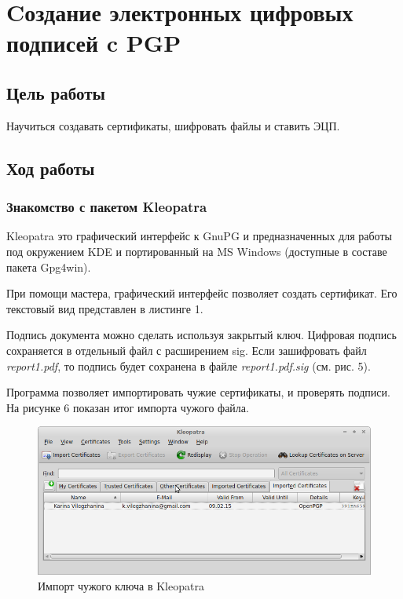 \documentclass[12pt,a4paper]{article}
\begin{document}
\section{Cоздание электронных цифровых подписей c PGP}

\subsection{Цель работы}
Научиться создавать сертификаты, шифровать файлы и ставить ЭЦП.
\subsection{Ход работы}

\subsubsection{Знакомство с пакетом Kleopatra}
Kleopatra это графический интерфейс к GnuPG и предназначенных для работы под
окружением KDE и портированный на MS Windows (доступные в составе пакета Gpg4win).

При помощи мастера, графический интерфейс позволяет создать сертификат. Его текстовый вид представлен в листинге 1.


Подпись документа можно сделать используя закрытый ключ. Цифровая подпись сохраняется в отдельный файл с расширением sig. Если зашифровать файл \textit{report1.pdf}, то подпись будет сохранена в файле \textit{report1.pdf.sig} (см. рис. 5).

Программа позволяет импортировать чужие сертификаты, и проверять подписи. На рисунке
6 показан итог импорта чужого файла.


\begin{figure}[h!]
\centering
\includegraphics[scale=0.5]{res/karina}
\caption{Импорт чужого ключа в Kleopatra}
\end{figure}
\end{document}
